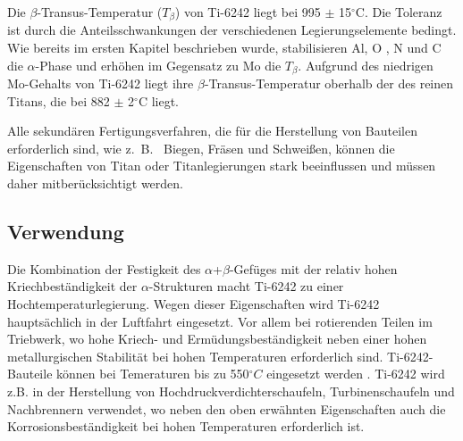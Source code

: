 Die $\beta$-Transus-Temperatur ($T_{\beta}$) von Ti-6242 liegt bei 995 $\pm$ 15$^\circ$C. Die Toleranz ist durch die Anteilsschwankungen der verschiedenen Legierungselemente bedingt. Wie bereits im ersten Kapitel beschrieben wurde, stabilisieren  Al, O , N und C die $\alpha$-Phase und erhöhen im Gegensatz zu Mo die $T_{\beta}$.
Aufgrund des niedrigen Mo-Gehalts von Ti-6242 liegt ihre $\beta$-Transus-Temperatur oberhalb der des reinen Titans, die bei 882 $\pm$ 2$^\circ$C liegt.

Alle sekundären Fertigungsverfahren, die für die Herstellung von Bauteilen erforderlich sind, wie z.~B.~ Biegen, Fräsen und Schweißen, können die  Eigenschaften von Titan oder Titanlegierungen stark beeinflussen und müssen daher mitberücksichtigt werden.


\subsection{Verwendung}


Die Kombination der Festigkeit des $\alpha$+$\beta$-Gefüges mit der relativ hohen Kriechbeständigkeit der $\alpha$-Strukturen macht Ti-6242 zu einer Hochtemperaturlegierung. 
Wegen dieser Eigenschaften wird Ti-6242 hauptsächlich in der Luftfahrt eingesetzt. Vor allem bei rotierenden Teilen im Triebwerk, wo hohe Kriech- und Ermüdungsbeständigkeit neben einer hohen metallurgischen Stabilität bei hohen Temperaturen erforderlich sind. 
Ti-6242-Bauteile können bei Temeraturen bis zu 550$^\circ C$ eingesetzt werden \cite{C.Leyens.2005}.
Ti-6242 wird z.B. in der Herstellung von Hochdruckverdichterschaufeln, Turbinenschaufeln und Nachbrennern verwendet, wo neben den oben erwähnten Eigenschaften auch die Korrosionsbeständigkeit bei hohen Temperaturen erforderlich ist. 


